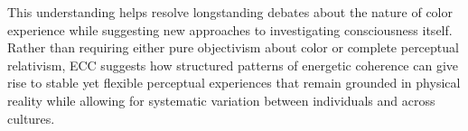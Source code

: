 This understanding helps resolve longstanding debates about the nature of color experience while suggesting new approaches to investigating consciousness itself. Rather than requiring either pure objectivism about color or complete perceptual relativism, ECC suggests how structured patterns of energetic coherence can give rise to stable yet flexible perceptual experiences that remain grounded in physical reality while allowing for systematic variation between individuals and across cultures.